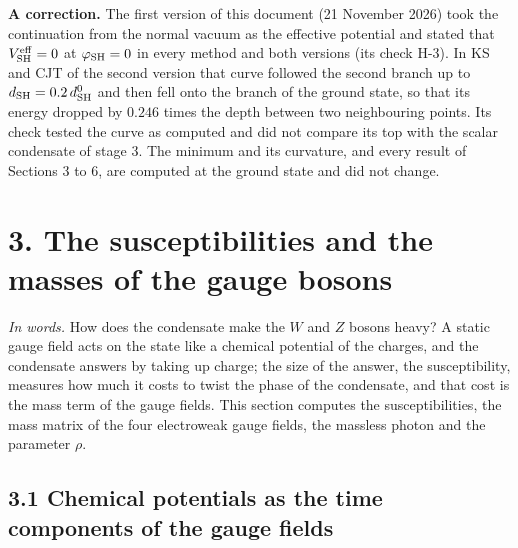 \documentclass[
  10pt,
]{article}
\begin{document}
\textbf{A correction.} The first version of this document (21 November
2026) took the continuation from the normal vacuum as the effective
potential and stated that \(V^{\rm eff}_{\rm SH}=0\) at
\(\varphi_{\rm SH}=0\) in every method and both versions (its check
H-3). In KS and CJT of the second version that curve followed the second
branch up to \(d_{\rm SH}=0.2\,d^0_{\rm SH}\) and then fell onto the
branch of the ground state, so that its energy dropped by \(0.246\)
times the depth between two neighbouring points. Its check tested the
curve as computed and did not compare its top with the scalar condensate
of stage 3. The minimum and its curvature, and every result of Sections
3 to 6, are computed at the ground state and did not change.

\hypertarget{the-susceptibilities-and-the-masses-of-the-gauge-bosons}{%
\section{3. The susceptibilities and the masses of the gauge
bosons}\label{the-susceptibilities-and-the-masses-of-the-gauge-bosons}}

\emph{In words.} How does the condensate make the \(W\) and \(Z\) bosons
heavy? A static gauge field acts on the state like a chemical potential
of the charges, and the condensate answers by taking up charge; the size
of the answer, the susceptibility, measures how much it costs to twist
the phase of the condensate, and that cost is the mass term of the gauge
fields. This section computes the susceptibilities, the mass matrix of
the four electroweak gauge fields, the massless photon and the parameter
\(\rho\).

\hypertarget{chemical-potentials-as-the-time-components-of-the-gauge-fields}{%
\subsection{3.1 Chemical potentials as the time components of the gauge
fields}\label{chemical-potentials-as-the-time-components-of-the-gauge-fields}}
\end{document}
